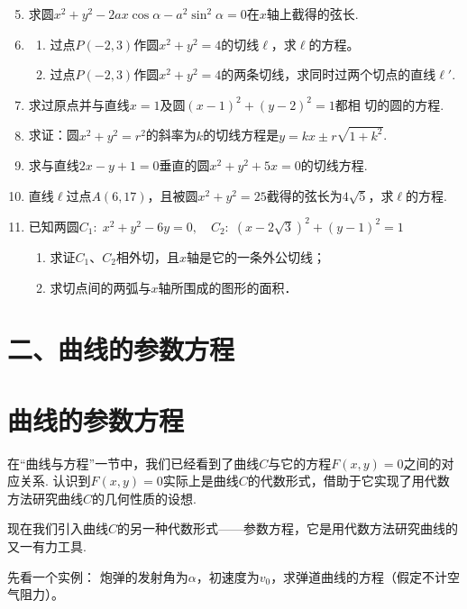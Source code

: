 \begin{enumerate}\setcounter{enumi}{4}
    \item 求圆$x^2+y^2-2ax\cos\alpha-a^2\sin^2\alpha=0$在$x$轴上截得的弦长.
    \item \begin{enumerate}[(1)]
        \item 过点$P(-2,3)$作圆$x^2+y^2=4$的切线$\ell$，求$\ell$的方程。
        \item 过点$P(-2,3)$作圆$x^2+y^2=4$的两条切线，求同时过两个切点的直线$\ell'$.
    \end{enumerate}  
    \item 求过原点并与直线$x=1$及圆$(x-1)^2+(y-2)^2=1$都相
    切的圆的方程.
    \item 求证：圆$x^2+y^2=r^2$的斜率为$k$的切线方程是$y=kx\pm r\sqrt{1+k^2}$.
    \item 求与直线$2x-y+1=0$垂直的圆$x^2+y^2+5x=0$的切线方程.
    \item 直线$\ell$过点$A(6,17)$，且被圆$x^2+y^2=25$截得的弦长为$4\sqrt{5}$，求$\ell$的方程.
    \item 已知两圆$C_1:\; x^2+y^2-6y=0,\quad C_2:\; (x-2\sqrt{3})^2+(y-1)^2=1$
\begin{enumerate}[(1)]
    \item 求证$C_1$、$C_2$相外切，且$x$轴是它的一条外公切线；
    \item 求切点间的两弧与$x$轴所围成的图形的面积．
\end{enumerate}
  
\end{enumerate}


\section*{二、曲线的参数方程}
\section{曲线的参数方程}
在“曲线与方程”一节中，我们已经看到了曲线$C$与它的方程$F(x,y)=0$之间的对应关系. 认识到$F(x,y)=0$实际上是曲线$C$的代数形式，借助于它实现了用代数方法研究曲线$C$的几何性质的设想.

现在我们引入曲线$C$的另一种代数形式——参数方程，它是用代数方法研究曲线的又一有力工具.

先看一个实例：
炮弹的发射角为$\alpha$，初速度为$v_0$，求弹道曲线的方程（假定不计空气阻力）。


